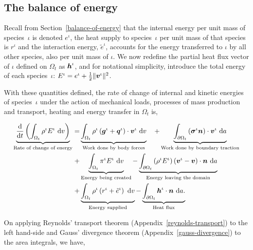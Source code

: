 \subsection{The balance of energy}
\label{eu-balance-of-energy}

Recall from Section~\ref{balance-of-energy} that the internal energy
per unit mass of species~$\iota$ is denoted $e^\iota$, the heat supply
to species~$\iota$ per unit mass of that species is $r^\iota$ and the
interaction energy, $\tilde{e}^\iota$, accounts for the energy
transferred to $\iota$ by all other species, also per unit mass of
$\iota$. We now redefine the partial heat flux vector of $\iota$
defined on $\Omega_{t}$ as $\mbox{\boldmath$ h$}^\iota$, and for notational simplicity,
introduce the total energy of each species~$\iota$: $E^{\iota} =
e^\iota + \frac{1}{2} \Vert\mbox{\boldmath$ v$}^\iota\Vert^2$.

With these quantities defined, the rate of change of internal and
kinetic energies of species~$\iota$ under the action of mechanical
loads, processes of mass production and transport, heating and energy
transfer in $\Omega_{t}$ is,

\begin{equation}
\begin{split}
\underbrace{\frac{\mathrm{d}}{\mathrm{d}t}\left(\int_{\Omega_{t}}
  \rho^{\iota} E^{\iota}\ \mathrm{d}v \right)}_{\text{Rate of change
    of energy}} = & \underbrace{\int_{\Omega_{t}} \rho^{\iota}
  \left(\bg^{\iota} +
  \bq^{\iota}\right)\cdot\bv^{\iota}\ \mathrm{d}v}_{\text{Work done by
    body forces}}\quad + \underbrace{\int_{\partial \Omega_{t}}
  \left(\Bsigma^{\iota}\bn\right)\cdot\bv^{\iota}\ \mathrm{d}a}_{\text{Work
    done by boundary traction}}\\ + & \underbrace{\int_{\Omega_{t}}
  \pi^{\iota}E^{\iota}\ \mathrm{d}v}_{\text{Energy being created}} -
\underbrace{\int_{\partial \Omega_{t}} \left(\rho^{\iota} E^{\iota}
  \right) \left(\bv^{\iota} - \bv\right) \cdot
  \bn\ \mathrm{d}a}_{\text{Energy leaving the domain}} \\ +
&\underbrace{\int_{\Omega_{t}} \rho^{\iota} \left(r^{\iota} +
  \tilde{e}^{\iota} \right)\ \mathrm{d}v}_{\text{Energy supplied}} -
\underbrace{\int_{\partial \Omega_{t}}
  \bh^{\iota}\cdot\bn\ \mathrm{d}a.}_{\text{Heat flux}}
\end{split}
\label{eu-globalbalanceofenergy}
\end{equation}

On applying Reynolds' transport theorem
(Appendix~\ref{reynolds-transport}) to the left hand-side and Gauss'
divergence theorem (Appendix~\ref{gauss-divergence}) to the area
integrals, we have,

